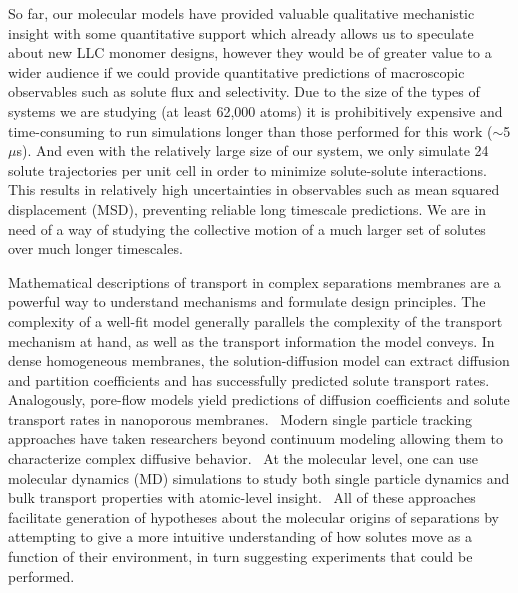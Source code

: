 \documentclass{article}
\begin{document}
  So far, our molecular models have provided valuable qualitative mechanistic insight 
  with some quantitative support which already allows us to speculate about new LLC
  monomer designs, however they would be of greater value to a wider audience if we 
  could provide quantitative predictions of macroscopic observables such as solute 
  flux and selectivity. Due to the size of the types of systems we are studying (at least 62,000 atoms)
  it is prohibitively expensive and time-consuming to run simulations longer than 
  those performed for this work ($\sim$5 $\mu$s). And even with the relatively large 
  size of our system, we only simulate 24 solute trajectories per unit cell in order
  to minimize solute-solute interactions. This results in relatively high uncertainties
  in observables such as mean squared displacement (MSD), preventing reliable long
  timescale predictions. We are in need of a way of studying the collective motion
  of a much larger set of solutes over much longer timescales.
  
  Mathematical descriptions of transport in complex separations membranes are 
  a powerful way to understand mechanisms and formulate design principles. 
  \cite{vinh-thang_predictive_2013,geens_transport_2006,darvishmanesh_mass_2016}
  The complexity of a well-fit model generally parallels the complexity of the transport 
  mechanism at hand, as well as the transport information the model conveys.
  In dense homogeneous membranes, the solution-diffusion model can extract 
  diffusion and partition coefficients and has successfully predicted solute 
  transport rates.~\cite{wijmans_solution-diffusion_1995} Analogously, pore-flow
  models yield predictions of diffusion coefficients and solute transport rates 
  in nanoporous membranes.~\cite{paul_diffusive_1974} Modern single particle 
  tracking approaches have taken researchers beyond continuum modeling allowing them to 
  characterize complex diffusive behavior.~\cite{manzo_review_2015} At the molecular
  level, one can use molecular dynamics (MD) simulations to study both single 
  particle dynamics and bulk transport properties with atomic-level insight.~\cite{coscia_chemically_2019,maginn_best_2018}
  All of these approaches facilitate generation of hypotheses about the
  molecular origins of separations by attempting to give a more intuitive 
  understanding of how solutes move as a function of their environment, in turn
  suggesting experiments that could be performed.
\end{document}
